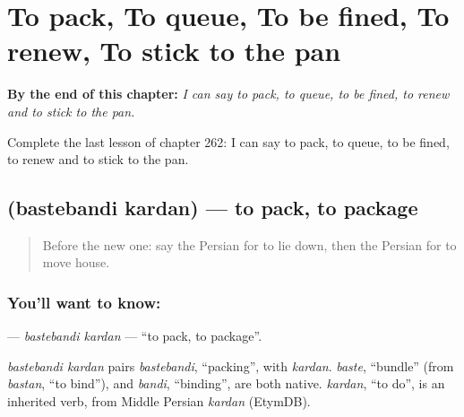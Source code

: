 
\chapter{To pack, To queue, To be fined, To renew, To stick to the pan}
\label{ch:fa-to-pack-to-queue-to-be-fined-to-renew-to-stick-to-the-pan}

\begin{chapteropening}
\textbf{By the end of this chapter:} \emph{I can say to pack, to queue, to be fined, to renew and to stick to the pan.}

Complete the last lesson of chapter 262: I can say to pack, to queue, to be fined, to renew and to stick to the pan.
\end{chapteropening}

\section[\texorpdfstring{\fa{بسته} \fa{بندی} \fa{کردن} (bastebandi kardan)}{بسته بندی کردن (bastebandi kardan)}]{   (bastebandi kardan) — to pack, to package}

\label{lesson:FA-C262-bastebandi-kardan}



\begin{quote}
Before the new one: say the Persian for to lie down, then the Persian for to move house.
\end{quote}

\subsection*{You'll want to know:   }
\textbf{  } — \emph{bastebandi kardan} — \textquotedblleft{}to pack, to package\textquotedblright{}.

\begin{cousinweb}
\emph{bastebandi kardan} pairs \emph{bastebandi}, \textquotedblleft{}packing\textquotedblright{}, with \emph{kardan}. \emph{baste}, \textquotedblleft{}bundle\textquotedblright{} (from \emph{bastan}, \textquotedblleft{}to bind\textquotedblright{}), and \emph{bandi}, \textquotedblleft{}binding\textquotedblright{}, are both native. \emph{kardan}, \textquotedblleft{}to do\textquotedblright{}, is an inherited verb, from Middle Persian \emph{kardan} (EtymDB).
\end{cousinweb}

